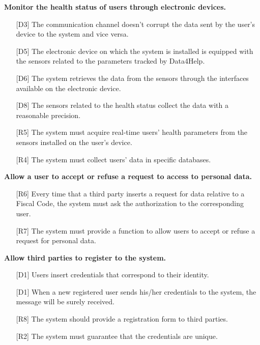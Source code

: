 \begin{enumerate} [label={\bf[G\arabic*]}]
    \item \textbf{Monitor the health status of users through electronic devices.}
        \begin{itemize}
            \item [{[D3]}] The communication channel doesn't corrupt the data sent by the user's device to the system and vice versa.
            \item [{[D5]}] The electronic device on which the system is installed is equipped with the sensors related to the parameters tracked by Data4Help.
            \item [{[D6]}] The  system  retrieves  the  data  from  the  sensors  through  the  interfaces available on the electronic device.
            \item [{[D8]}] The sensors related to the health status collect the data with a reasonable precision.
            \item [{[R5]}] The system must acquire real-time users' health parameters from the sensors installed on the user's device.
            \item [{[R4]}] The system must collect users' data in specific databases.
        \end{itemize}
        
    \item \textbf{Allow a user to accept or refuse a request to access to personal data.}
    \begin{itemize}
            \item [{[R6]}] Every time that a third party inserts a request for data relative to a Fiscal Code, the system must ask the authorization to the corresponding user.
            \item [{[R7]}] The system must provide a function to allow users to accept or refuse a request for personal data.
        \end{itemize}

    \item \textbf{Allow third parties to register to the system.}
        \begin{itemize}
            \item [{[D1]}] Users insert credentials that correspond to their identity.
            \item [{[D1]}] When a new registered user sends his/her credentials to the system, the message will be surely received.
            \item [{[R8]}] The system should provide a registration form to third parties.
            \item [{[R2]}] The system must guarantee that the credentials are unique.
        \end{itemize}
        

\end{enumerate}
